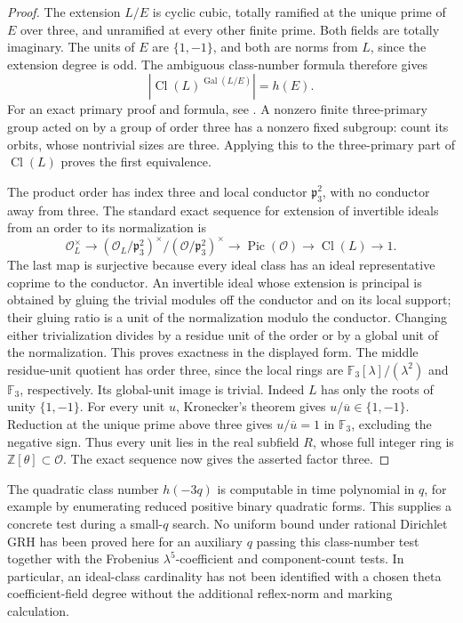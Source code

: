 \documentclass[11pt]{article}
\theoremstyle{definition}
\theoremstyle{remark}
\begin{document}
\begin{proof}
The extension \(L/E\) is cyclic cubic, totally ramified at
the unique prime of \(E\) over three, and unramified at
every other finite prime. Both fields are totally imaginary.
The units of \(E\) are \(\{1,-1\}\), and both are norms
from \(L\), since the extension degree is odd. The ambiguous
class-number formula therefore gives
\[
 |\operatorname{Cl}(L)^{\operatorname{Gal}(L/E)}|=h(E).
\]
For an exact primary proof and formula, see
\citep[Theorem~1.1, p.~2]{YuAmbiguous2016}.
A nonzero finite three-primary group acted on by a group of
order three has a nonzero fixed subgroup: count its orbits,
whose nontrivial sizes are three. Applying this to the
three-primary part of \(\operatorname{Cl}(L)\) proves the
first equivalence.

The product order has index three and local conductor
\(\mathfrak p_3^2\), with no conductor away from three.
The standard exact sequence for extension of invertible ideals
from an order to its normalization is
\[
 \mathcal O_L^\times\longrightarrow
 (\mathcal O_L/\mathfrak p_3^2)^\times/
 (\mathcal O/\mathfrak p_3^2)^\times
 \longrightarrow\operatorname{Pic}(\mathcal O)
 \longrightarrow\operatorname{Cl}(L)\longrightarrow1.
\]
The last map is surjective because every ideal class has an ideal representative coprime to the conductor. An invertible ideal whose extension is principal is obtained by gluing the trivial modules off the conductor and on its local support; their gluing ratio is a unit of the normalization modulo the conductor. Changing either trivialization divides by a residue unit of the order or by a global unit of the normalization. This proves exactness in the displayed form.
The middle residue-unit quotient has order three, since the
local rings are \(\mathbb F_3[\lambda]/(\lambda^2)\)
and \(\mathbb F_3\), respectively. Its global-unit image
is trivial. Indeed \(L\) has only the roots of unity
\(\{1,-1\}\). For every unit \(u\), Kronecker's theorem
gives \(u/\overline u\in\{1,-1\}\). Reduction at the
unique prime above three gives \(u/\overline u=1\) in
\(\mathbb F_3\), excluding the negative sign. Thus every
unit lies in the real subfield \(R\), whose full integer
ring is \(\mathbb Z[\theta]\subset\mathcal O\).
The exact sequence now gives the asserted factor three.
\end{proof}

The quadratic class number \(h(-3q)\) is computable in
time polynomial in \(q\), for example by enumerating reduced
positive binary quadratic forms. This supplies a concrete
test during a small-\(q\) search. No uniform bound under
rational Dirichlet GRH has been proved here for an auxiliary
\(q\) passing this class-number test together with the
Frobenius \(\lambda^5\)-coefficient and component-count
tests. In particular, an ideal-class cardinality has not been
identified with a chosen theta coefficient-field degree
without the additional reflex-norm and marking calculation.
\end{document}
